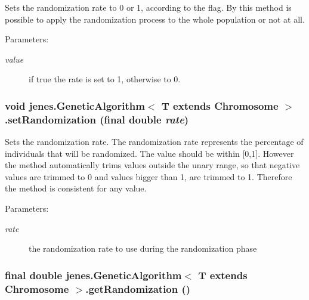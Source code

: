 Sets the randomization rate to 0 or 1, according to the flag. By this method is possible to apply the randomization process to the whole population or not at all. 

\begin{Desc}
\item[Parameters:]
\begin{description}
\item[{\em value}]if true the rate is set to 1, otherwise to 0. \end{description}
\end{Desc}
\hypertarget{classjenes_1_1_genetic_algorithm_3_01_t_01extends_01_chromosome_01_4_78cb20ba6256d06e7cd04696e697cc4e}{
\subsubsection[setRandomization]{\setlength{\rightskip}{0pt plus 5cm}void jenes.GeneticAlgorithm$<$ T extends Chromosome $>$.setRandomization (final double {\em rate})}}
\label{classjenes_1_1_genetic_algorithm_3_01_t_01extends_01_chromosome_01_4_78cb20ba6256d06e7cd04696e697cc4e}


Sets the randomization rate. The randomization rate represents the percentage of individuals that will be randomized. The value should be within \mbox{[}0,1\mbox{]}. However the method automatically trims values outside the unary range, so that negative values are trimmed to 0 and values bigger than 1, are trimmed to 1. Therefore the method is consistent for any value. 

\begin{Desc}
\item[Parameters:]
\begin{description}
\item[{\em rate}]the randomization rate to use during the randomization phase \end{description}
\end{Desc}
\hypertarget{classjenes_1_1_genetic_algorithm_3_01_t_01extends_01_chromosome_01_4_dd75e6182615af89791921472d2fbc9f}{
\subsubsection[getRandomization]{\setlength{\rightskip}{0pt plus 5cm}final double jenes.GeneticAlgorithm$<$ T extends Chromosome $>$.getRandomization ()}}
\label{classjenes_1_1_genetic_algorithm_3_01_t_01extends_01_chromosome_01_4_dd75e6182615af89791921472d2fbc9f}



